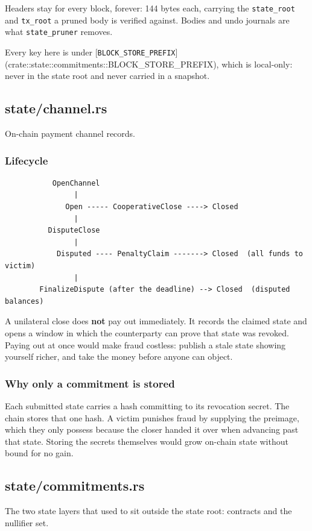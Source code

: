 \documentclass[11pt,a4paper]{article}
\begin{document}
Headers stay for every block, forever: 144 bytes each, carrying the
\texttt{state\_root} and \texttt{tx\_root} a pruned body is verified against. Bodies and
undo journals are what \texttt{state\_pruner} removes.

Every key here is under
[\texttt{BLOCK\_STORE\_PREFIX}](crate::state::commitments::BLOCK\_STORE\_PREFIX), which is local-only: never
in the state root and never carried in a snapshot.

\subsection{state/channel.rs}
On-chain payment channel records.

\subsubsection{Lifecycle}

\begin{verbatim}
           OpenChannel
                |
              Open ----- CooperativeClose ----> Closed
                |
          DisputeClose
                |
            Disputed ---- PenaltyClaim -------> Closed  (all funds to victim)
                |
        FinalizeDispute (after the deadline) --> Closed  (disputed balances)
\end{verbatim}

A unilateral close does \textbf{not} pay out immediately. It records the claimed
state and opens a window in which the counterparty can prove that state was
revoked. Paying out at once would make fraud costless: publish a stale state
showing yourself richer, and take the money before anyone can object.

\subsubsection{Why only a commitment is stored}

Each submitted state carries a hash committing to its revocation secret. The
chain stores that one hash. A victim punishes fraud by supplying the
preimage, which they only possess because the closer handed it over when
advancing past that state. Storing the secrets themselves would grow
on-chain state without bound for no gain.

\subsection{state/commitments.rs}
The two state layers that used to sit outside the state root: contracts
and the nullifier set.
\end{document}
